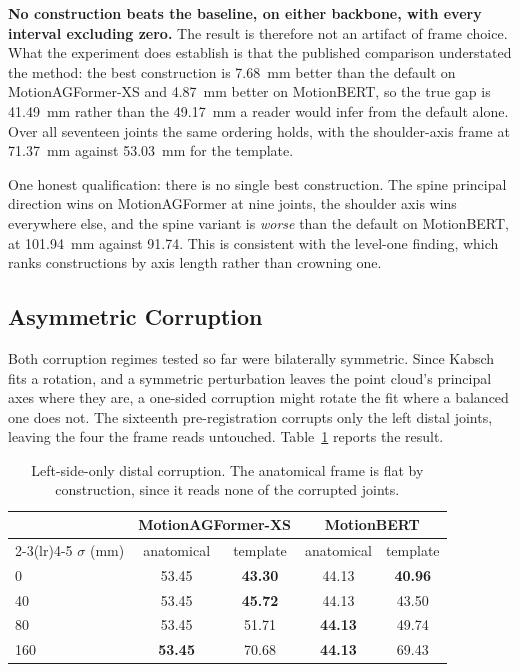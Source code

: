 \documentclass[12pt,a4paper]{report}
\begin{document}
\noindent \textbf{No construction beats the baseline, on either backbone, with every
interval excluding zero.} The result is therefore not an artifact of frame choice.
What the experiment does establish is that the published comparison understated
the method: the best construction is 7.68~mm better than the default on
MotionAGFormer-XS and 4.87~mm better on MotionBERT, so the true gap is 41.49~mm
rather than the 49.17~mm a reader would infer from the default alone. Over all
seventeen joints the same ordering holds, with the shoulder-axis frame at
71.37~mm against 53.03~mm for the template.

One honest qualification: there is no single best construction. The spine
principal direction wins on MotionAGFormer at nine joints, the shoulder axis
wins everywhere else, and the spine variant is \emph{worse} than the default on
MotionBERT, at 101.94~mm against 91.74. This is consistent with the level-one
finding, which ranks constructions by axis length rather than crowning one.

\subsection{Asymmetric Corruption}

Both corruption regimes tested so far were bilaterally symmetric. Since Kabsch
fits a rotation, and a symmetric perturbation leaves the point cloud's principal
axes where they are, a one-sided corruption might rotate the fit where a
balanced one does not. The sixteenth pre-registration corrupts only the left
distal joints, leaving the four the frame reads untouched. Table~\ref{tab:asymmetric}
reports the result.

\begin{table}[H]
\centering
\small
\caption[Left-side-only distal corruption]{Left-side-only distal corruption. The anatomical frame is flat by construction, since it reads none of the corrupted joints.}
\label{tab:asymmetric}
\begin{tabular}{lcccc}
\toprule
& \multicolumn{2}{c}{MotionAGFormer-XS} & \multicolumn{2}{c}{MotionBERT} \\
\cmidrule(lr){2-3}\cmidrule(lr){4-5}
$\sigma$ (mm) & anatomical & template & anatomical & template \\
\midrule
0 & 53.45 & \textbf{43.30} & 44.13 & \textbf{40.96} \\
40 & 53.45 & \textbf{45.72} & 44.13 & 43.50 \\
80 & 53.45 & 51.71 & \textbf{44.13} & 49.74 \\
160 & \textbf{53.45} & 70.68 & \textbf{44.13} & 69.43 \\
\bottomrule
\end{tabular}
\end{table}
\end{document}
